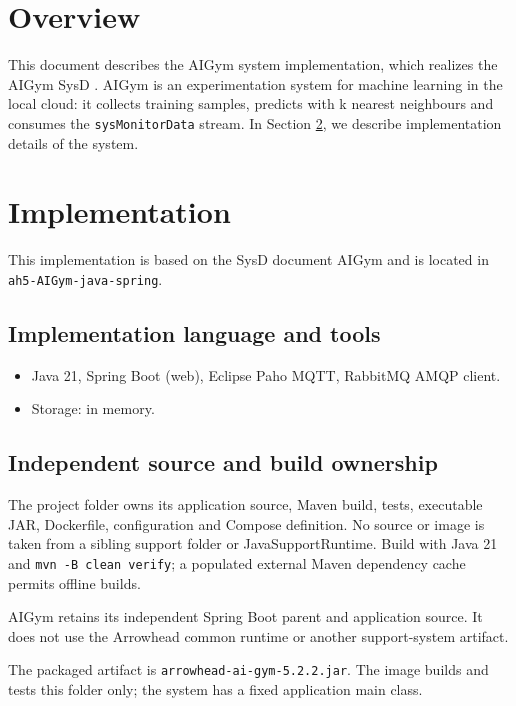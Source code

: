 \documentclass[a4paper]{arrowhead}
\begin{document}
\section{Overview}
\label{sec:overview}

This document describes the AIGym system implementation, which realizes the AIGym SysD \cite{aig-sysd}. AIGym is an experimentation system for machine learning in the local cloud: it collects training samples, predicts with k nearest neighbours and consumes the \texttt{sysMonitorData} stream.
In Section \ref{Implementation}, we describe implementation details of the system.

\newpage

\section{Implementation}
\label{Implementation}

This implementation is based on the SysD document AIGym \cite{aig-sysd} and is located in \texttt{ah5-AIGym-java-spring}.

\subsection{Implementation language and tools}
\begin{itemize}
\item Java 21, Spring Boot (web), Eclipse Paho MQTT, RabbitMQ AMQP client.
\item Storage: in memory.
\end{itemize}

\subsection{Independent source and build ownership}
The project folder owns its application source, Maven build, tests, executable JAR, Dockerfile, configuration and Compose definition. No source or image is taken from a sibling support folder or JavaSupportRuntime. Build with Java 21 and \texttt{mvn -B clean verify}; a populated external Maven dependency cache permits offline builds.

AIGym retains its independent Spring Boot parent and application source. It does not use the Arrowhead common runtime or another support-system artifact.

The packaged artifact is \texttt{arrowhead-\allowbreak{}ai-\allowbreak{}gym-5.2.2.jar}. The image builds and tests this folder only; the system has a fixed application main class.
\end{document}
